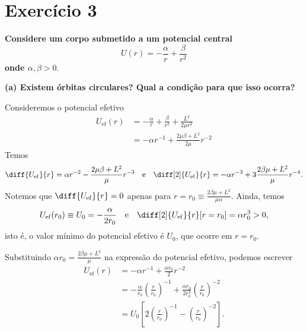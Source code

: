 \section*{Exercício 3}
\textbf{Considere um corpo submetido a um potencial central
    \begin{equation*}
        U(r) = -\frac{\alpha}{r} + \frac{\beta}{r^2}
    \end{equation*}
onde \(\alpha,\beta>0.\)}

\textbf{(a) Existem órbitas circulares? Qual a condição para que isso ocorra?}

Consideremos o potencial efetivo
\begin{align}
    U_\mathrm{ef}(r) &= -\frac{\alpha}{r} + \frac{\beta}{r^2} + \frac{L^2}{2\mu r^2}\\
                     &= -\alpha r^{-1} + \frac{2\mu\beta + L^2}{2\mu}r^{-2}
\end{align}
Temos
\begin{equation}
    \diff{U_\mathrm{ef}}{r} = \alpha r^{-2} - \frac{2\mu\beta + L^2}{\mu}r^{-3}\quad\text{e}\quad\diff[2]{U_\mathrm{ef}}{r} = -\alpha r^{-3} + 3\frac{2\beta\mu + L^2}{\mu}r^{-4}.
\end{equation}
Notemos que \(\diff{U_\mathrm{ef}}{r} = 0\) apenas para \(r = r_0 \equiv \frac{2\beta\mu +L^2}{\mu \alpha}\). Ainda, temos
\begin{equation}
    U_\mathrm{ef}(r_0) \equiv U_0 = -\frac{\alpha}{2r_0}\quad\text{e}\quad\diff[2]{U_\mathrm{ef}}{r}[r=r_0] = \alpha r_0^3 > 0,
\end{equation}
isto é, o valor mínimo do potencial efetivo é \(U_0\), que ocorre em \(r = r_0\).

Substituindo \(\alpha r_0 = \frac{2\beta \mu + L^2}{\mu}\) na expressão do potencial efetivo, podemos escrever
\begin{align}
    U_\mathrm{ef}(r) &= -\alpha r^{-1} + \frac{\alpha r_0}{2}r^{-2}\\
                     &= -\frac{\alpha}{r_0} \left(\frac{r}{r_0}\right)^{-1} + \frac{\alpha r_0}{2r_0^2}\left(\frac{r}{r_0}\right)^{-2}\\
                     &= U_0\left[2\left(\frac{r}{r_0}\right)^{-1} - \left(\frac{r}{r_0}\right)^{-2}\right].
\end{align}


